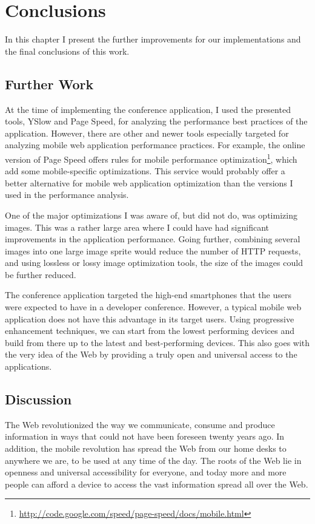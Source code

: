 \chapter{Conclusions}
\label{chapter:conclusions}

In this chapter I present the further improvements for our
implementations and the final conclusions of this work.

\section{Further Work}

At the time of implementing the conference application, I used the
presented tools, YSlow and Page Speed, for analyzing the performance
best practices of the application. However, there are other and newer
tools especially targeted for analyzing mobile web application
performance practices. For example, the online version of Page Speed
offers rules for mobile performance
optimization\footnote{\url{http://code.google.com/speed/page-speed/docs/mobile.html}},
which add some mobile-specific optimizations. This service would
probably offer a better alternative for mobile web application
optimization than the versions I used in the performance analysis.

One of the major optimizations I was aware of, but did not do, was
optimizing images. This was a rather large area where I could have had
significant improvements in the application performance. Going
further, combining several images into one large image sprite would
reduce the number of HTTP requests, and using lossless or lossy image
optimization tools, the size of the images could be further reduced.

The conference application targeted the high-end smartphones that the
users were expected to have in a developer conference. However, a
typical mobile web application does not have this advantage in its
target users. Using progressive enhancement techniques, we can start
from the lowest performing devices and build from there up to the
latest and best-performing devices. This also goes with the very idea
of the Web by providing a truly open and universal access to the
applications.

\section{Discussion}

The Web revolutionized the way we communicate, consume and produce
information in ways that could not have been foreseen twenty years
ago. In addition, the mobile revolution has spread the Web from our
home desks to anywhere we are, to be used at any time of the day. The
roots of the Web lie in openness and universal accessibility for
everyone, and today more and more people can afford a device to access
the vast information spread all over the Web.


